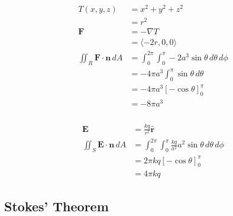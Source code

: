\documentclass{article}
\begin{document}
\setcounter{subsubsection}{36}
\subsubsection{}

\begin{align*}
  T(x, y, z)                               & = x^2 + y^2 + z^2                                                \\
                                           & = r^2                                                            \\
  \mathbf{F}                               & = -\nabla T                                                      \\
                                           & = \langle -2 r, 0, 0 \rangle                                     \\
  \iint_R \mathbf{F} \cdot \mathbf{n} \,dA & = \int_0^{2 \pi} \int_0^\pi -2 a^3 \sin \theta \,d\theta \,d\phi \\
                                           & = -4 \pi a^3 \int_0^\pi \sin \theta \,d\theta                    \\
                                           & = -4 \pi a^3 [-\cos \theta]_0^\pi                                \\
                                           & = -8 \pi a^3
\end{align*}

\setcounter{subsubsection}{38}
\subsubsection{}

\begin{align*}
  \mathbf{E}                               & = \frac{k q}{r^2} \hat{\mathbf{r}}                                            \\
  \iint_S \mathbf{E} \cdot \mathbf{n} \,dA & = \int_0^{2 \pi} \int_0^\pi \frac{k q}{a^2} a^2 \sin \theta \,d\theta \,d\phi \\
                                           & = 2 \pi k q [-\cos \theta]_0^\pi                                              \\
                                           & = 4 \pi k q
\end{align*}

\subsection{Stokes' Theorem}
\end{document}
